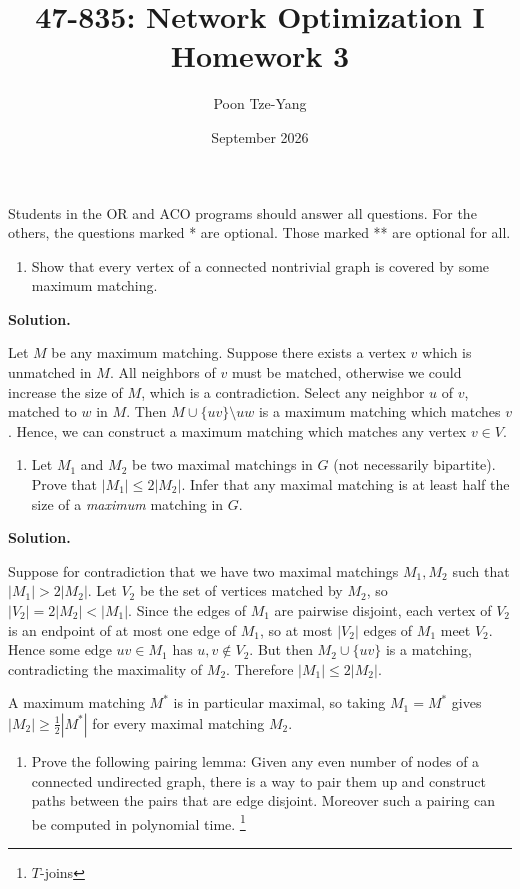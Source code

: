 \documentclass[11pt,letterpaper]{article}
\title{47-835: Network Optimization I \\ Homework 3}
\author{Poon Tze-Yang}
\date{September 2026}
\theoremstyle{definition}
\newcommand{\solution}{\medskip\noindent\textbf{Solution.}\par\medskip}
\begin{document}
\maketitle

Students in the OR and ACO programs should answer all questions. For the others, the questions marked * are optional. Those marked ** are optional for all.

\begin{enumerate}[series=q]
\item Show that every vertex of a connected nontrivial graph is covered by some maximum matching.
\end{enumerate}

\solution
Let $M$ be any maximum matching. 
Suppose there exists a vertex $v$ which is unmatched in $M$.
All neighbors of $v$ must be matched, otherwise we could increase the size of $M$, which is a contradiction.
Select any neighbor $u$ of $v$, matched to $w$ in $M$.
Then $M\cup\{uv\}\setminus {uw}$ is a maximum matching which matches $v$.
Hence, we can construct a maximum matching which matches any vertex $v\in V$.

\begin{enumerate}[resume=q]
\item Let $M_1$ and $M_2$ be two maximal matchings in $G$ (not necessarily bipartite). Prove that $|M_1| \leq 2|M_2|$. Infer that any maximal matching is at least half the size of a \emph{maximum} matching in $G$.
\end{enumerate}

\solution
Suppose for contradiction that we have two maximal matchings $M_1, M_2$ such that $|M_1|> 2|M_2|$.
Let $V_2$ be the set of vertices matched by $M_2$, so $|V_2| = 2|M_2| < |M_1|$.
Since the edges of $M_1$ are pairwise disjoint, each vertex of $V_2$ is an endpoint of at most one edge of $M_1$, so at most $|V_2|$ edges of $M_1$ meet $V_2$.
Hence some edge $uv \in M_1$ has $u, v \notin V_2$.
But then $M_2 \cup \{uv\}$ is a matching, contradicting the maximality of $M_2$.
Therefore $|M_1| \leq 2|M_2|$.

A maximum matching $M^*$ is in particular maximal, so taking $M_1 = M^*$ gives $|M_2| \geq \frac{1}{2}|M^*|$ for every maximal matching $M_2$.


\begin{enumerate}[resume=q]
\item Prove the following pairing lemma: Given any even number of nodes of a connected undirected graph, there is a way to pair them up and construct paths between the pairs that are edge disjoint. Moreover such a pairing can be computed in polynomial time. \footnote{$T$-joins}
\end{enumerate}
\end{document}
